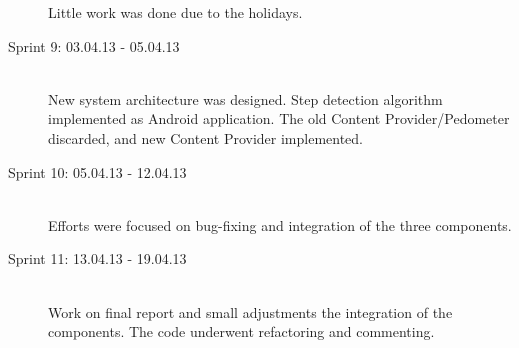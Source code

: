 \begin{description}
Little work was done due to the holidays.
\item[Sprint 9: 03.04.13 - 05.04.13] \hline \hfill \\
New system architecture was designed. Step detection algorithm implemented as Android application. The old Content Provider/Pedometer discarded, and new Content Provider implemented. 
\item[Sprint 10: 05.04.13 - 12.04.13] \hline \hfill \\
Efforts were focused on bug-fixing and integration of the three components. 
\item[Sprint 11: 13.04.13 - 19.04.13] \hline \hfill \\
Work on final report and small adjustments the integration of the components. The code underwent refactoring and commenting. 
\end{description}